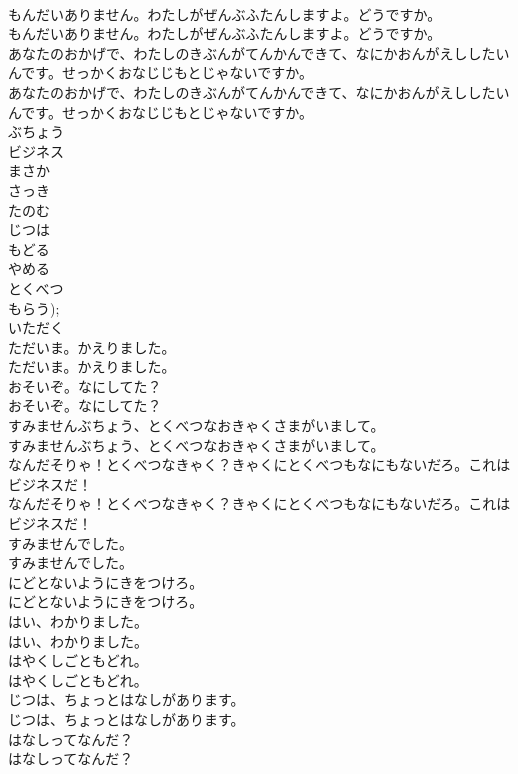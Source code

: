 \documentclass[8pt]{extreport}
\begin{document}
\begin{CJK}{UTF8}{min}
\\	もんだいありません。わたしがぜんぶふたんしますよ。どうですか。
\\	もんだいありません。わたしがぜんぶふたんしますよ。どうですか。
\\	あなたのおかげで、わたしのきぶんがてんかんできて、なにかおんがえししたいんです。せっかくおなじじもとじゃないですか。
\\	あなたのおかげで、わたしのきぶんがてんかんできて、なにかおんがえししたいんです。せっかくおなじじもとじゃないですか。
\\	ぶちょう
\\	ビジネス
\\	まさか
\\	さっき
\\	たのむ
\\	じつは
\\	もどる
\\	やめる
\\	とくべつ
\\	もらう); 
\\	いただく
\\	ただいま。かえりました。
\\	ただいま。かえりました。
\\	おそいぞ。なにしてた？
\\	おそいぞ。なにしてた？
\\	すみませんぶちょう、とくべつなおきゃくさまがいまして。
\\	すみませんぶちょう、とくべつなおきゃくさまがいまして。
\\	なんだそりゃ！とくべつなきゃく？きゃくにとくべつもなにもないだろ。これはビジネスだ！
\\	なんだそりゃ！とくべつなきゃく？きゃくにとくべつもなにもないだろ。これはビジネスだ！
\\	すみませんでした。
\\	すみませんでした。
\\	にどとないようにきをつけろ。
\\	にどとないようにきをつけろ。
\\	はい、わかりました。
\\	はい、わかりました。
\\	はやくしごともどれ。
\\	はやくしごともどれ。
\\	じつは、ちょっとはなしがあります。
\\	じつは、ちょっとはなしがあります。
\\	はなしってなんだ？
\\	はなしってなんだ？

\end{CJK}
\end{document}
